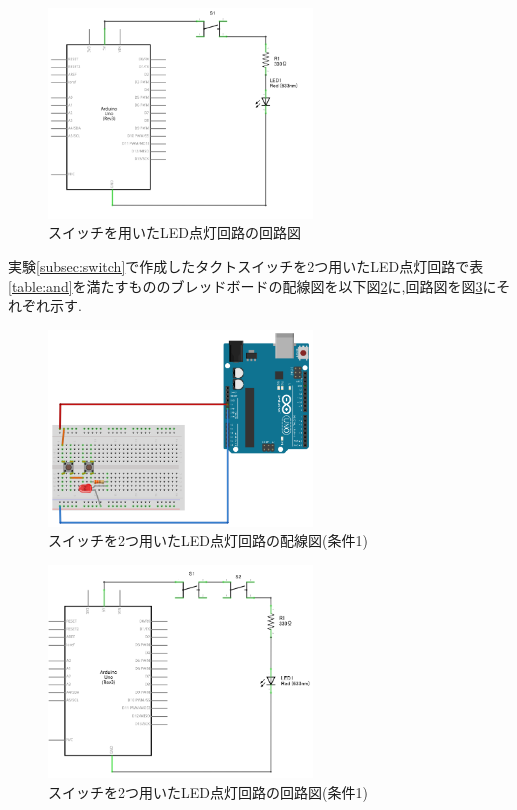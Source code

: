\documentclass{jarticle}
\begin{document}
\begin{figure}[H]
\begin{center}
\includegraphics[width=7.0cm]{images/kadai2-1-6_回路図.png}
\caption{スイッチを用いたLED点灯回路の回路図}
\label{fig:2-1-6kairo}
\end{center}
\end{figure}

実験\ref{subsec:switch}で作成したタクトスイッチを2つ用いたLED点灯回路で表\ref{table:and}を満たすもののブレッドボードの配線図を以下図\ref{fig:2-1-7-and-bread}に,回路図を図\ref{fig:2-1-7-and-kairo}にそれぞれ示す.

\begin{figure}[H]
\begin{center}
\includegraphics[width=7.0cm]{images/kadai2-1-7-AND_ブレッドボード.png}
\caption{スイッチを2つ用いたLED点灯回路の配線図(条件1)}
\label{fig:2-1-7-and-bread}
\end{center}
\end{figure}

\begin{figure}[H]
\begin{center}
\includegraphics[width=7.0cm]{images/kadai2-1-7-AND_回路図.png}
\caption{スイッチを2つ用いたLED点灯回路の回路図(条件1)}
\label{fig:2-1-7-and-kairo}
\end{center}
\end{figure}
\end{document}
